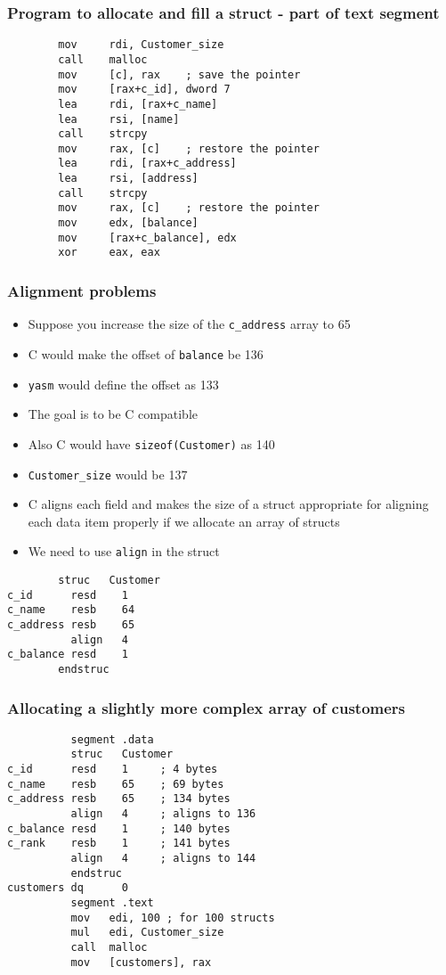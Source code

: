 \documentclass{beamer}
\begin{document}
\begin{frame}[fragile]
    \frametitle{Program to allocate and fill a struct - part of text segment}
\begin{verbatim}
        mov     rdi, Customer_size
        call    malloc
        mov     [c], rax    ; save the pointer
        mov     [rax+c_id], dword 7
        lea     rdi, [rax+c_name]
        lea     rsi, [name]
        call    strcpy
        mov     rax, [c]    ; restore the pointer
        lea     rdi, [rax+c_address]
        lea     rsi, [address]
        call    strcpy
        mov     rax, [c]    ; restore the pointer
        mov     edx, [balance]
        mov     [rax+c_balance], edx
        xor     eax, eax
\end{verbatim}
\end{frame}

\begin{frame}[fragile]
    \frametitle{Alignment problems}
    \begin{itemize}
        \item Suppose you increase the size of the {\tt c\_address} array to 65
        \item C would make the offset of {\tt balance} be 136
        \item {\tt yasm} would define the offset as 133
        \item The goal is to be C compatible
        \item Also C would have {\tt sizeof(Customer)} as 140
        \item {\tt Customer\_size} would be 137
        \item C aligns each field and makes the size of a struct appropriate
              for aligning each data item properly if we allocate an array of structs
        \item We need to use {\tt align} in the struct
    \end{itemize}
\begin{verbatim}
        struc   Customer
c_id      resd    1
c_name    resb    64
c_address resb    65
          align   4
c_balance resd    1
        endstruc
\end{verbatim}
\end{frame}

\begin{frame}[fragile]
    \frametitle{Allocating a slightly more complex array of customers}
\begin{verbatim}
          segment .data
          struc   Customer
c_id      resd    1     ; 4 bytes
c_name    resb    65    ; 69 bytes
c_address resb    65    ; 134 bytes
          align   4     ; aligns to 136
c_balance resd    1     ; 140 bytes
c_rank    resb    1     ; 141 bytes
          align   4     ; aligns to 144
          endstruc
customers dq      0
          segment .text
          mov   edi, 100 ; for 100 structs
          mul   edi, Customer_size 
          call  malloc
          mov   [customers], rax
\end{verbatim}
\end{frame}
\end{document}
